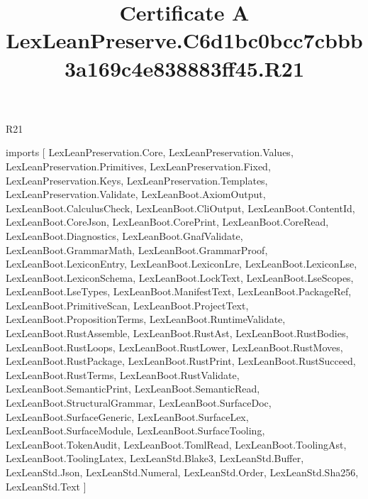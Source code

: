 \begin{lexlean}{R21}
\title{Certificate A LexLeanPreserve.C6d1bc0bcc7cbbb3a169c4e838883ff45.R21}
\begin{coremodule}
imports [
  LexLeanPreservation.Core,
  LexLeanPreservation.Values,
  LexLeanPreservation.Primitives,
  LexLeanPreservation.Fixed,
  LexLeanPreservation.Keys,
  LexLeanPreservation.Templates,
  LexLeanPreservation.Validate,
  LexLeanBoot.AxiomOutput,
  LexLeanBoot.CalculusCheck,
  LexLeanBoot.CliOutput,
  LexLeanBoot.ContentId,
  LexLeanBoot.CoreJson,
  LexLeanBoot.CorePrint,
  LexLeanBoot.CoreRead,
  LexLeanBoot.Diagnostics,
  LexLeanBoot.GnafValidate,
  LexLeanBoot.GrammarMath,
  LexLeanBoot.GrammarProof,
  LexLeanBoot.LexiconEntry,
  LexLeanBoot.LexiconLre,
  LexLeanBoot.LexiconLse,
  LexLeanBoot.LexiconSchema,
  LexLeanBoot.LockText,
  LexLeanBoot.LseScopes,
  LexLeanBoot.LseTypes,
  LexLeanBoot.ManifestText,
  LexLeanBoot.PackageRef,
  LexLeanBoot.PrimitiveScan,
  LexLeanBoot.ProjectText,
  LexLeanBoot.PropositionTerms,
  LexLeanBoot.RuntimeValidate,
  LexLeanBoot.RustAssemble,
  LexLeanBoot.RustAst,
  LexLeanBoot.RustBodies,
  LexLeanBoot.RustLoops,
  LexLeanBoot.RustLower,
  LexLeanBoot.RustMoves,
  LexLeanBoot.RustPackage,
  LexLeanBoot.RustPrint,
  LexLeanBoot.RustSucceed,
  LexLeanBoot.RustTerms,
  LexLeanBoot.RustValidate,
  LexLeanBoot.SemanticPrint,
  LexLeanBoot.SemanticRead,
  LexLeanBoot.StructuralGrammar,
  LexLeanBoot.SurfaceDoc,
  LexLeanBoot.SurfaceGeneric,
  LexLeanBoot.SurfaceLex,
  LexLeanBoot.SurfaceModule,
  LexLeanBoot.SurfaceTooling,
  LexLeanBoot.TokenAudit,
  LexLeanBoot.TomlRead,
  LexLeanBoot.ToolingAst,
  LexLeanBoot.ToolingLatex,
  LexLeanStd.Blake3,
  LexLeanStd.Buffer,
  LexLeanStd.Json,
  LexLeanStd.Numeral,
  LexLeanStd.Order,
  LexLeanStd.Sha256,
  LexLeanStd.Text
]


\end{coremodule}
\end{lexlean}
